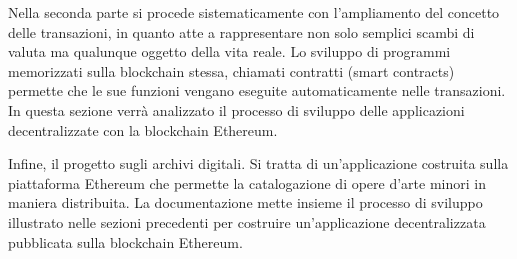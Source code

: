 Nella seconda parte si procede sistematicamente con l’ampliamento del concetto delle transazioni, in quanto atte a rappresentare non solo semplici scambi di valuta ma qualunque oggetto della vita reale. Lo sviluppo di programmi memorizzati sulla blockchain stessa, chiamati contratti (smart contracts) permette che le sue funzioni vengano eseguite automaticamente nelle transazioni. In questa sezione verrà analizzato il processo di sviluppo delle applicazioni decentralizzate con la blockchain Ethereum.

Infine, il progetto sugli archivi digitali. Si tratta di un’applicazione costruita sulla piattaforma Ethereum che permette la catalogazione di opere d’arte minori in maniera distribuita. La documentazione mette insieme il processo di sviluppo illustrato nelle sezioni precedenti per costruire un’applicazione decentralizzata pubblicata sulla blockchain Ethereum.